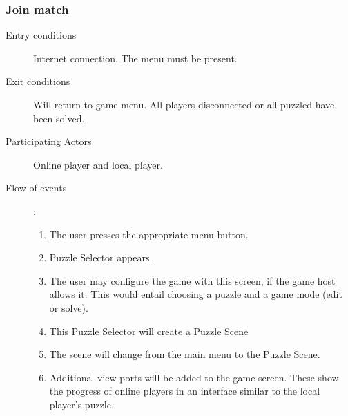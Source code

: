 \documentclass[12pt]{article}
\begin{document}
\begin{mdframed}
    \subsubsection{Join match}
    \begin{description}
        \item[Entry conditions] Internet connection. The menu must be present.
        \item[Exit conditions] Will return to game menu. All players
            disconnected or all puzzled have been solved.
        \item[Participating Actors] Online player and local player.
        \item[Flow of events]:
            \begin{enumerate}
                \item The user presses the appropriate menu button.
                \item Puzzle Selector appears.
                \item The user may configure the game with this screen, if
                    the game host allows it. This would
                    entail choosing a puzzle and a game mode (edit or solve).
                \item This Puzzle Selector will create a Puzzle Scene
                \item The scene will change from the main menu to the Puzzle
                    Scene.
                \item Additional view-ports will be added to the game screen. 
                These show the progress of online players in an interface
                similar to the local player's puzzle.
            \end{enumerate}
    \end{description}
\end{mdframed}
\end{document}
